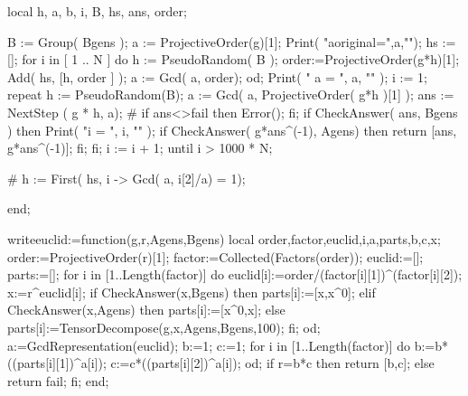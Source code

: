 	local  h, a, b, i, B, hs, ans, order;

	    		
	B := Group( Bgens );
	a := ProjectiveOrder(g)[1];
        Print( "aoriginal=",a,"\n");
        hs := [];
	for i in [ 1 .. N ] do
	    h := PseudoRandom( B );
            order:=ProjectiveOrder(g*h)[1];
            Add( hs, [h, order ] );
	    a := Gcd( a, order);
	od;
        Print( " a = ", a, "\n" );
	i := 1;
        repeat 
              h := PseudoRandom(B);
	      a := Gcd( a, ProjectiveOrder( g*h )[1] );
	      ans := NextStep ( g * h, a);
#             if ans<>fail then Error(); fi;
	      if CheckAnswer( ans, Bgens ) then
		   Print( "i = ", i, "\n" );
                   if CheckAnswer( g*ans^(-1), Agens) then
                       return [ans, g*ans^(-1)];
                   fi;
	      fi;
	      i := i + 1;
        until  i > 1000 * N;

#		h :=  First( hs, i -> Gcd( a, i[2]/a) = 1);

end;


writeeuclid:=function(g,r,Agens,Bgens)
local order,factor,euclid,i,a,parts,b,c,x;
order:=ProjectiveOrder(r)[1];
factor:=Collected(Factors(order));
euclid:=[];
parts:=[];
     for i in [1..Length(factor)] do
           euclid[i]:=order/(factor[i][1])^(factor[i][2]);
           x:=r^euclid[i];
           if CheckAnswer(x,Bgens) then
                       parts[i]:=[x,x^0];
           elif CheckAnswer(x,Agens) then
                       parts[i]:=[x^0,x];
           else 
                       parts[i]:=TensorDecompose(g,x,Agens,Bgens,100);
           fi;     
     od;
a:=GcdRepresentation(euclid);
b:=1;
c:=1;
      for i in [1..Length(factor)] do
            b:=b*((parts[i][1])^a[i]);
            c:=c*((parts[i][2])^a[i]);
      od;
      if r=b*c then
            return [b,c];
      else
            return fail;
      fi;
end;

